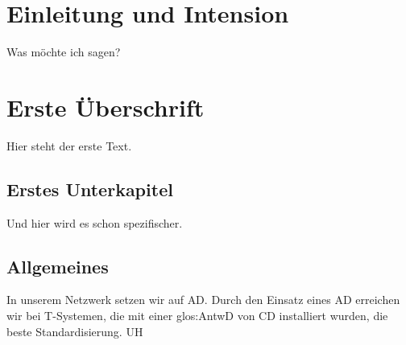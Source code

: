 
\chapter{Einleitung und Intension}
\label{sec:EinleitungUndIntension}
Was möchte ich sagen?

\chapter{Erste Überschrift}
\label{sec:ErsteUeberschrift}
Hier steht der erste Text.

\section{Erstes Unterkapitel}
\label{sec:ErstesUnterkapitel}
Und hier wird es schon spezifischer.


\section{Allgemeines}
\label{sec:Allgemeines}

In unserem Netzwerk setzen wir auf \gls{AD}. Durch den Einsatz
eines \gls{AD} erreichen wir bei \gls{T}-Systemen, die mit einer
\gls{glos:AntwD} von \gls{CD} installiert wurden, die beste Standardisierung.
\gls{UH}